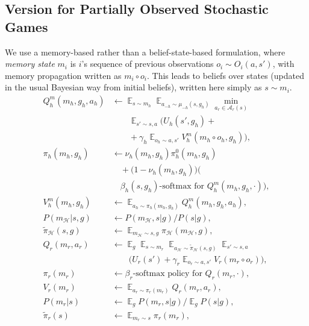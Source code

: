 \documentclass[letterpaper]{article} %
\DeclareMathOperator*{\E}{\mathbb{E}}
\def\A{\mathcal{A}}
\def\H{\mathcal{H}}
\begin{document}
\subsection*{Version for Partially Observed Stochastic Games}
We use a memory-based rather than a belief-state-based formulation, where {\em memory state} $m_i$ is $i$'s sequence of previous observations $o_i\sim O_i(a,s')$, with memory propagation written as $m_i\circ o_i$. 
This leads to beliefs over states (updated in the usual Bayesian way from initial beliefs), written here simply as $s\sim m_i$.
\begin{align}
    Q^m_h(m_h,g_h,a_h) &\gets \textstyle\E_{s\sim m_h}\E_{a_{-h}\sim\mu_{-h}(s,g_h)} \min_{a_r\in\A_r(s)} \nonumber \\   
    &\qquad\textstyle  \E_{s'\sim s,a}\big(U_h(s',g_h) + {}\nonumber\\
    &\qquad\textstyle + \gamma_h \E_{o_h\sim a,s'}V^m_h(m_h\circ o_h,g_h)\big), \nonumber%
    \\
    \pi_h(m_h,g_h) &\gets \nu_h(m_h,g_h)\pi^0_h(m_h,g_h)\nonumber\\
    &\quad + \big(1-\nu_h(m_h,g_h)\big)\big(\nonumber\\
    &\quad\text{$\beta_h(s,g_h)$-softmax for~} Q^m_h(m_h,g_h,\cdot)\big), \nonumber%
    \\ 
    V^m_h(m_h,g_h) &\gets \textstyle\E_{a_h\sim\pi_h(m_h,g_h)} Q^m_h(m_h,g_h,a_h), \nonumber%
    \\
    P(m_\H|s,g) &\gets P(m_\H,s|g) / P(s|g), \label{POSG_mH} \\
    \tilde\pi_\H(s,g) &\gets \textstyle\E_{m_\H\sim s,g}\pi_\H(m_\H,g), \label{POSG_tildepiH} \\ 
    Q_r(m_r,a_r) &\gets \textstyle\E_g\E_{s\sim m_r}\E_{a_\H\sim\tilde\pi_\H(s,g)} \E_{s'\sim s,a} \nonumber \\
        &\qquad\textstyle\big(U_r(s') + \gamma_r \E_{o_r\sim a,s'} V_r(m_r\circ o_r) \big), \nonumber%
        \\
    \pi_r(m_r) &\gets\text{$\beta_r$-softmax policy for~} Q_r(m_r,\cdot), \nonumber%
    \\
    V_r(m_r) &\gets \textstyle\E_{a_r\sim\pi_r(m_r)} Q_r(m_r,a_r), \nonumber%
    \\
    P(m_r|s) &\gets \textstyle\E_g P(m_r,s|g) / \E_g P(s|g), \label{POSG_mr} \\
    \tilde\pi_r(s) &\gets \textstyle\E_{m_r\sim s}\pi_r(m_r), \label{POSG_tildeprH} \\ 

\end{align}
\end{document}

